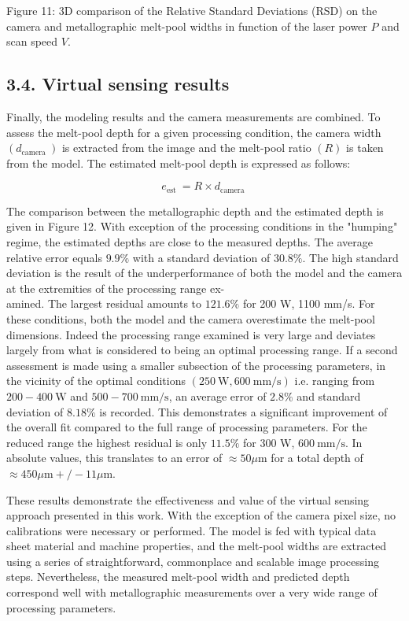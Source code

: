 \documentclass[10pt]{article}
\begin{document}
Figure 11: 3D comparison of the Relative Standard Deviations (RSD) on the camera and metallographic melt-pool widths in function of the laser power $P$ and scan speed $V$.

\subsection*{3.4. Virtual sensing results}
Finally, the modeling results and the camera measurements are combined. To assess the melt-pool depth for a given processing condition, the camera width $\left(d_{\text {camera }}\right)$ is extracted from the image and the melt-pool ratio $(R)$ is taken from the model. The estimated melt-pool depth is expressed as follows:

$$
e_{\text {est }}=R \times d_{\text {camera }}
$$

The comparison between the metallographic depth and the estimated depth is given in Figure 12. With exception of the processing conditions in the "humping" regime, the estimated depths are close to the measured depths. The average relative error equals $9.9 \%$ with a standard deviation of $30.8 \%$. The high standard deviation is the result of the underperformance of both the model and the camera at the extremities of the processing range ex-\\
amined. The largest residual amounts to $121.6 \%$ for 200 W, 1100 mm/s. For these conditions, both the model and the camera overestimate the melt-pool dimensions. Indeed the processing range examined is very large and deviates largely from what is considered to being an optimal processing range. If a second assessment is made using a smaller subsection of the processing parameters, in the vicinity of the optimal conditions $(250 \mathrm{~W}, 600 \mathrm{~mm} / \mathrm{s})$ i.e. ranging from $200-400 \mathrm{~W}$ and $500-700 \mathrm{~mm} / \mathrm{s}$, an average error of $2.8 \%$ and standard deviation of $8.18 \%$ is recorded. This demonstrates a significant improvement of the overall fit compared to the full range of processing parameters. For the reduced range the highest residual is only $11.5 \%$ for 300 W, $600 \mathrm{~mm} / \mathrm{s}$. In absolute values, this translates to an error of $\approx 50 \mu \mathrm{m}$ for a total depth of $\approx 450 \mu \mathrm{m}+/-11 \mu \mathrm{m}$.

These results demonstrate the effectiveness and value of the virtual sensing approach presented in this work. With the exception of the camera pixel size, no calibrations were necessary or performed. The model is fed with typical data sheet material and machine properties, and the melt-pool widths are extracted using a series of straightforward, commonplace and scalable image processing steps. Nevertheless, the measured melt-pool width and predicted depth correspond well with metallographic measurements over a very wide range of processing parameters.
\end{document}
